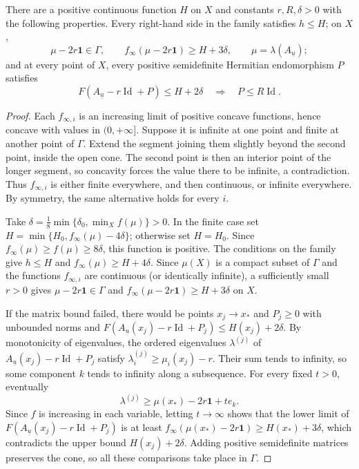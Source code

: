\begin{lemma}\label{lem:strict-gap-matrix-bound}
There are a positive continuous function $H$ on $X$ and constants $r,R,\delta>0$ with the following properties. Every right-hand side in the family satisfies $h\leq H$; on $X$,
\[
 \mu-2r\mathbf1\in\Gamma,\qquad
 f_\infty(\mu-2r\mathbf1)\geq H+3\delta,
 \qquad \mu=\lambda(A_{\underline u});
\]
and at every point of $X$, every positive semidefinite Hermitian endomorphism $P$ satisfies
\[
 F(A_{\underline u}-r\operatorname{Id}+P)\leq H+2\delta
 \quad\Longrightarrow\quad P\leq R\operatorname{Id}.
\]
\end{lemma}
\begin{proof}
Each $f_{\infty,i}$ is an increasing limit of positive concave functions, hence concave with values in $(0,+\infty]$. Suppose it is infinite at one point and finite at another point of $\Gamma$. Extend the segment joining them slightly beyond the second point, inside the open cone. The second point is then an interior point of the longer segment, so concavity forces the value there to be infinite, a contradiction. Thus $f_{\infty,i}$ is either finite everywhere, and then continuous, or infinite everywhere. By symmetry, the same alternative holds for every $i$.

Take $\delta=\frac18\min\{\delta_0,\min_Xf(\mu)\}>0$. In the finite case set $H=\min\{H_0,f_\infty(\mu)-4\delta\}$; otherwise set $H=H_0$. Since $f_\infty(\mu)\geq f(\mu)\geq8\delta$, this function is positive. The conditions on the family give $h\leq H$ and $f_\infty(\mu)\geq H+4\delta$. Since $\mu(X)$ is a compact subset of $\Gamma$ and the functions $f_{\infty,i}$ are continuous (or identically infinite), a sufficiently small $r>0$ gives $\mu-2r\mathbf1\in\Gamma$ and $f_\infty(\mu-2r\mathbf1)\geq H+3\delta$ on $X$.

If the matrix bound failed, there would be points $x_j\to x_*$ and $P_j\geq0$ with unbounded norms and $F(A_{\underline u}(x_j)-r\operatorname{Id}+P_j)\leq H(x_j)+2\delta$. By monotonicity of eigenvalues, the ordered eigenvalues $\lambda^{(j)}$ of $A_{\underline u}(x_j)-r\operatorname{Id}+P_j$ satisfy $\lambda_i^{(j)}\geq\mu_i(x_j)-r$. Their sum tends to infinity, so some component $k$ tends to infinity along a subsequence. For every fixed $t>0$, eventually
\[
 \lambda^{(j)}\geq\mu(x_*)-2r\mathbf1+te_k.
\]
Since $f$ is increasing in each variable, letting $t\to\infty$ shows that the lower limit of $F(A_{\underline u}(x_j)-r\operatorname{Id}+P_j)$ is at least $f_\infty(\mu(x_*)-2r\mathbf1)\geq H(x_*)+3\delta$, which contradicts the upper bound $H(x_j)+2\delta$. Adding positive semidefinite matrices preserves the cone, so all these comparisons take place in $\Gamma$.
\end{proof}

